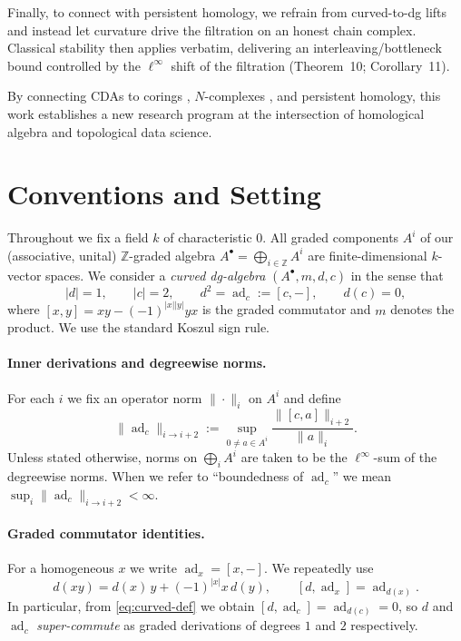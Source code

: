 \documentclass[preprint,12pt]{elsarticle}
\newcommand{\ad}{\operatorname{ad}}
\begin{document}
Finally, to connect with persistent homology, we refrain from curved-to-dg lifts and instead
let curvature drive the filtration on an honest chain complex. Classical stability then applies
verbatim, delivering an interleaving/bottleneck bound controlled by the $\ell^\infty$ shift of the
filtration (Theorem~10; Corollary~11).
 
By connecting CDAs to corings \cite{Brzezinski2013Curved}, $N$-complexes \cite{AngelD:2007}, and persistent homology, this work establishes a new research program at the intersection of homological algebra and topological data science.

\section{Conventions and Setting}\label{sec:conventions}

Throughout we fix a field $k$ of characteristic $0$. 
All graded components $A^i$ of our (associative, unital) $\mathbb{Z}$-graded algebra 
$A^\bullet=\bigoplus_{i\in\mathbb{Z}}A^i$ are finite-dimensional $k$-vector spaces.
We consider a \emph{curved dg-algebra} $(A^\bullet,m,d,c)$ in the sense that
\begin{equation}\label{eq:curved-def}
|d|=1,\qquad |c|=2,\qquad d^2=\ad_c:=[c,-],\qquad d(c)=0,
\end{equation}
where $[x,y]=xy-(-1)^{|x||y|}yx$ is the graded commutator and $m$ denotes the product.
We use the standard Koszul sign rule. 

\paragraph{Inner derivations and degreewise norms.}
For each $i$ we fix an operator norm $\|\cdot\|_{i}$ on $A^i$ and define
\[
\|\ad_c\|_{i\to i+2}:=\sup_{0\neq a\in A^i}\frac{\|[c,a]\|_{i+2}}{\|a\|_i}.
\]
Unless stated otherwise, norms on $\bigoplus_i A^i$ are taken to be the $\ell^\infty$-sum 
of the degreewise norms. When we refer to ``boundedness of $\ad_c$'' we mean 
$\sup_i\|\ad_c\|_{i\to i+2}<\infty$.

\paragraph{Graded commutator identities.}
For a homogeneous $x$ we write $\ad_x=[x,-]$. We repeatedly use
\begin{equation}\label{eq:super-Leibniz}
d(xy)=d(x)\,y+(-1)^{|x|}x\,d(y),\qquad [d,\ad_x]=\ad_{d(x)}.
\end{equation}
In particular, from \eqref{eq:curved-def} we obtain $[d,\ad_c]=\ad_{d(c)}=0$, 
so $d$ and $\ad_c$ \emph{super-commute} as graded derivations of degrees $1$ and $2$ respectively.
\end{document}
